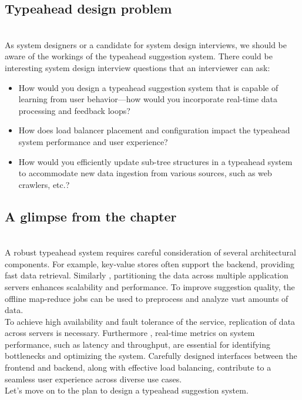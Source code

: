 \subsection{Typeahead design problem}\label{dcv2qNCpFVxgsX39mL3mk}
\\
As system designers or a candidate for system design interviews, we should be aware of the workings of the typeahead suggestion system. There could be interesting system design interview questions that an interviewer can ask:

\begin{itemize}
\item
\protect{}\label{ox1Rgjd5IWY6_2JYF87TU}
How would you design a typeahead suggestion system that is capable of learning from user behavior---how would you incorporate real-time data processing and feedback loops?
\item
\protect{}\label{yS1zcuIXKCABPVV9NRzoN}
How does load balancer placement and configuration impact the typeahead system performance and user experience?
\item
How would you efficiently update sub-tree structures in a typeahead system to accommodate new data ingestion from various sources, such as web crawlers, etc.?
\end{itemize}

\subsection{A glimpse from the chapter}\label{MiOiJj8z7enwi38-Fca4_}
\\
A robust typeahead system requires careful consideration of several architectural components. For example, key-value stores often support the backend, providing fast data retrieval. Similarly , partitioning the data across multiple application servers enhances scalability and performance. To improve suggestion quality, the offline map-reduce jobs can be used to preprocess and analyze vast amounts of data.
\\
To achieve high availability and fault tolerance of the service, replication of data across servers is necessary. Furthermore , real-time metrics on system performance, such as latency and throughput, are essential for identifying bottlenecks and optimizing the system. Carefully designed interfaces between the frontend and backend, along with effective load balancing, contribute to a seamless user experience across diverse use cases.
\\
Let's move on to the plan to design a typeahead suggestion system.

